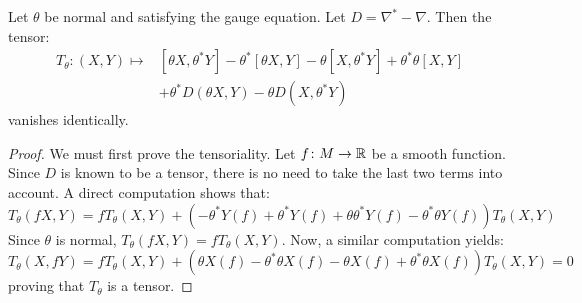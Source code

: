 \begin{prop}
    \label{prop:gen_nijenhuis}
    Let $\theta$ be normal and satisfying the gauge equation. Let $D=\nabla^*-\nabla$. Then the tensor:
    \begin{equation}
        \label{eq:gen_nijenhuis}
        \begin{split}
        T_\theta \colon (X,Y) \mapsto & \left[ \theta X, \theta^*Y \right] - \theta^* \left[ \theta X, Y \right] 
        - \theta \left[X, \theta^*Y  \right] + \theta^* \theta \left[ X,Y \right]\\
        & +\theta^* D\left( \theta X, Y \right) - \theta D\left( X, \theta^*Y \right)
        \end{split}
    \end{equation}
    vanishes identically.
\end{prop} 
\begin{proof}
    We must first prove the tensoriality. Let $f \colon M \to \mathbb{R}$ be a smooth function. Since $D$ is known to be 
    a tensor, there is no need to take the last two terms into account. A direct computation shows that:
    \begin{equation}
        T_\theta(fX,Y) = f T_\theta(X,Y) +
         \left( - \theta^* Y(f) + \theta^* Y(f) + \theta \theta^* Y(f) - \theta^* \theta Y(f) \right) T_\theta(X,Y)
    \end{equation}
    Since $\theta$ is normal, $ T_\theta(fX,Y) = f T_\theta(X,Y) $.
    Now, a similar computation yields:
    \begin{equation}
        T_\theta(X,fY) = f T_\theta(X,Y) + 
        \left( \theta X(f) - \theta^*\theta X(f) - \theta  X(f) + \theta^* \theta X(f) \right)T_\theta(X,Y) = 0
    \end{equation}
    proving that $T_\theta$ is a tensor.


\end{proof}
